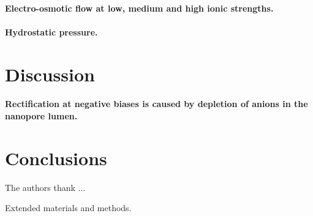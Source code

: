 \documentclass[journal=ancac3, manuscript=article, etalmode=truncate,maxauthors=0]{achemso}
\begin{document}
\paragraph{Electro-osmotic flow at low, medium and high ionic strengths.}
\paragraph{Hydrostatic pressure.}



\section{Discussion}\label{sect:discussion}

\paragraph{Rectification at negative biases is caused by depletion of anions in the nanopore lumen.}

\section{Conclusions}\label{sect:conclusions}

\begin{acknowledgement}
The authors thank ...
\end{acknowledgement}


\begin{suppinfo}
	Extended materials and methods.
\end{suppinfo}








\newpage %


%
\end{document}
